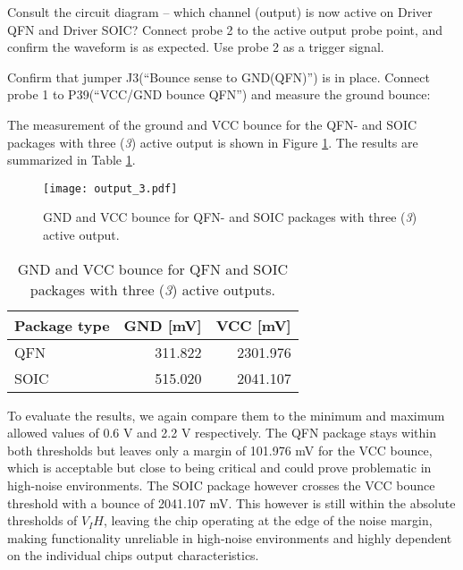 \documentclass[../main.tex]{subfiles}
\begin{document}
\vspace{10pt}

Consult the circuit diagram – which channel (output) is now active on Driver QFN and Driver SOIC? Connect probe 2 to the active output probe point, and confirm the waveform is as expected. Use probe 2 as a trigger signal.

\vspace{10pt}

Confirm that jumper J3(“Bounce sense to GND(QFN)”) is in place. Connect probe 1 to P39(“VCC/GND bounce QFN”) and measure the ground bounce:

\solution

The measurement of the ground and VCC bounce for the QFN- and SOIC packages with three (\textit{3}) active output is shown in Figure \ref{fig:gnd_vcc_output_3}. The results are summarized in Table \ref{tab:output_3}.

\begin{figure}[H]
    \centering
    \texttt{[image: output\_3.pdf]}
    \caption{GND and VCC bounce for QFN- and SOIC packages with three (\textit{3}) active output.}
    \label{fig:gnd_vcc_output_3}
\end{figure}

\begin{table}[H]
    \centering
    \begin{tabular}{l | r r}
        \toprule[1pt]
        Package type    & GND [mV]  & VCC [mV]\\
        \midrule
        QFN             & 311.822   & 2301.976  \\
        SOIC            & 515.020   & 2041.107  \\
        \bottomrule[1pt]
    \end{tabular}
    \caption{GND and VCC bounce for QFN and SOIC packages with three (\textit{3}) active outputs.}
    \label{tab:output_3}
\end{table}

To evaluate the results, we again compare them to the minimum and maximum allowed values of 0.6 V and 2.2 V respectively. The QFN package stays within both thresholds but leaves only a margin of 101.976 mV for the VCC bounce, which is acceptable but close to being critical and could prove problematic in high-noise environments. The SOIC package however crosses the VCC bounce threshold with a bounce of 2041.107 mV. This however is still within the absolute thresholds of $V_IH$, leaving the chip operating at the edge of the noise margin, making functionality unreliable in high-noise environments and highly dependent on the individual chips output characteristics.
\end{document}
